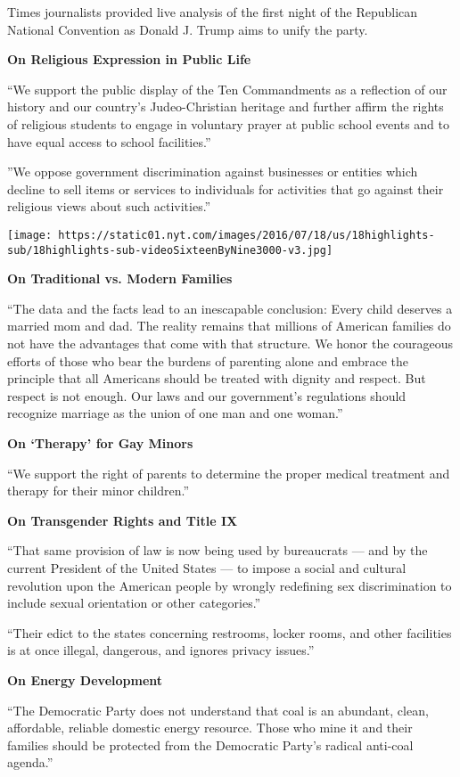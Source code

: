 Times journalists provided live analysis of the first night of the
Republican National Convention as Donald J. Trump aims to unify the
party.

\textbf{On Religious Expression in Public Life}

``We support the public display of the Ten Commandments as a reflection
of our history and our country's Judeo-Christian heritage and further
affirm the rights of religious students to engage in voluntary prayer at
public school events and to have equal access to school facilities.''

''We oppose government discrimination against businesses or entities
which decline to sell items or services to individuals for activities
that go against their religious views about such activities.''

\texttt{[image: https://static01.nyt.com/images/2016/07/18/us/18highlights-sub/18highlights-sub-videoSixteenByNine3000-v3.jpg]}

\textbf{On Traditional vs. Modern Families}

``The data and the facts lead to an inescapable conclusion: Every child
deserves a married mom and dad. The reality remains that millions of
American families do not have the advantages that come with that
structure. We honor the courageous efforts of those who bear the burdens
of parenting alone and embrace the principle that all Americans should
be treated with dignity and respect. But respect is not enough. Our laws
and our government's regulations should recognize marriage as the union
of one man and one woman.''

\textbf{On `Therapy' for Gay Minors}

``We support the right of parents to determine the proper medical
treatment and therapy for their minor children.''

\textbf{On Transgender Rights and Title IX}

``That same provision of law is now being used by bureaucrats --- and by
the current President of the United States --- to impose a social and
cultural revolution upon the American people by wrongly redefining sex
discrimination to include sexual orientation or other categories.''

``Their edict to the states concerning restrooms, locker rooms, and
other facilities is at once illegal, dangerous, and ignores privacy
issues.''

\textbf{On Energy Development}

``The Democratic Party does not understand that coal is an abundant,
clean, affordable, reliable domestic energy resource. Those who mine it
and their families should be protected from the Democratic Party's
radical anti-coal agenda.''

